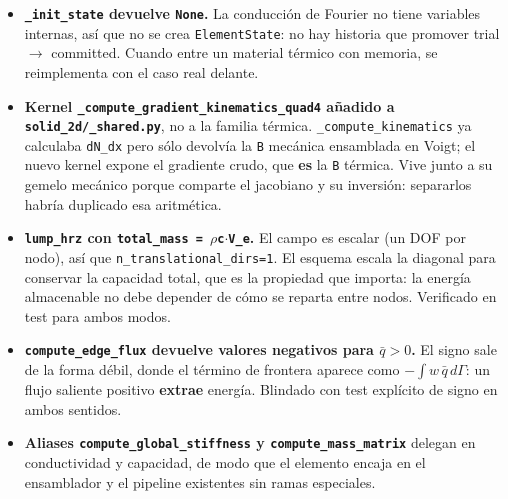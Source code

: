 \documentclass[11pt,letterpaper,oneside]{report}
\begin{document}
\begin{itemize}
  \item \textbf{\texttt{\_init\_state} devuelve \texttt{None}.} La conducción de Fourier no tiene variables internas, así que no se crea \texttt{ElementState}: no hay historia que promover trial \ensuremath{\to} committed. Cuando entre un material térmico con memoria, se reimplementa con el caso real delante.
\end{itemize}

\begin{itemize}
  \item \textbf{Kernel \texttt{\_compute\_gradient\_kinematics\_quad4} añadido a \texttt{solid\_2d/\_shared.py}}, no a la familia térmica. \texttt{\_compute\_kinematics} ya calculaba \texttt{dN\_dx} pero sólo devolvía la \texttt{B} mecánica ensamblada en Voigt; el nuevo kernel expone el gradiente crudo, que \textbf{es} la \texttt{B} térmica. Vive junto a su gemelo mecánico porque comparte el jacobiano y su inversión: separarlos habría duplicado esa aritmética.
\end{itemize}

\begin{itemize}
  \item \textbf{\texttt{lump\_hrz} con \texttt{total\_mass = \ensuremath{\rho}c\ensuremath{\cdot}V\_e}.} El campo es escalar (un DOF por nodo), así que \texttt{n\_translational\_dirs=1}. El esquema escala la diagonal para conservar la capacidad total, que es la propiedad que importa: la energía almacenable no debe depender de cómo se reparta entre nodos. Verificado en test para ambos modos.
\end{itemize}

\begin{itemize}
  \item \textbf{\texttt{compute\_edge\_flux} devuelve valores negativos para $\bar q > 0$.} El signo sale de la forma débil, donde el término de frontera aparece como $-\int w\,\bar q\,d\Gamma$: un flujo saliente positivo \textbf{extrae} energía. Blindado con test explícito de signo en ambos sentidos.
\end{itemize}

\begin{itemize}
  \item \textbf{Aliases \texttt{compute\_global\_stiffness} y \texttt{compute\_mass\_matrix}} delegan en conductividad y capacidad, de modo que el elemento encaja en el ensamblador y el pipeline existentes sin ramas especiales.
\end{itemize}
\end{document}
